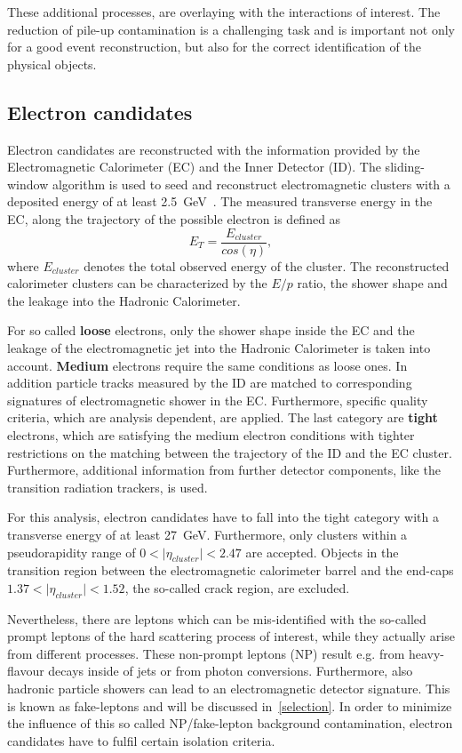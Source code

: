 These additional processes, are overlaying with the interactions of interest. The reduction of pile-up contamination is a challenging task and is important not only for  a good event reconstruction, but also for the correct identification of the physical objects. 

\subsection{Electron candidates}   
Electron candidates are reconstructed with the information provided by the Electromagnetic Calorimeter (EC) and the Inner Detector (ID). The sliding-window algorithm is used to seed and reconstruct electromagnetic clusters with a deposited energy of at least 2.5~GeV~\cite{Aad:2014fxa}. The measured transverse energy in the EC, along the trajectory of the possible electron is defined as
\begin{equation}
	E_T= \frac{E_{cluster}}{cos(\eta)},
\end{equation} 
where $E_{cluster}$ denotes the total observed energy of the cluster. The reconstructed calorimeter clusters can be characterized by the $E/p$ ratio, the shower shape and the leakage into the Hadronic Calorimeter.
  
For so called \textbf{loose} electrons, only the shower shape inside the EC and the leakage of the electromagnetic jet into the Hadronic Calorimeter is taken into account. \textbf{Medium} electrons require the same conditions as loose ones. In addition particle tracks measured by the ID are matched to corresponding signatures of electromagnetic shower in the EC. Furthermore, specific quality criteria, which are analysis dependent, are applied. The last category are  \textbf{tight} electrons, which are satisfying the medium electron conditions with tighter restrictions on the   matching between the  trajectory of the ID and the EC cluster. Furthermore, additional information from further detector components, like the  transition radiation trackers, is used.~\cite{Aad:2011mk} 

 For this analysis, electron candidates have to fall into the tight category with  a transverse energy of at least 27~GeV. Furthermore, only clusters within a pseudorapidity range of $0 < \mid\eta_{cluster}\mid < 2.47$ are accepted. Objects in the transition region between the electromagnetic calorimeter barrel and the end-caps $1.37 < \mid\eta_{cluster}\mid < 1.52$, the so-called crack region, are excluded.

Nevertheless, there are leptons which can be mis-identified with the so-called prompt leptons of the hard scattering process of interest, while they actually arise from different processes. These  non-prompt leptons  (NP) result e.g. from heavy-flavour decays inside of jets or from photon conversions. Furthermore, also hadronic particle showers can lead to an electromagnetic  detector signature. This is known as fake-leptons and will be discussed in~\cref{selection}. In order to minimize the influence of this so called NP/fake-lepton background contamination, electron candidates have to fulfil certain isolation criteria.


